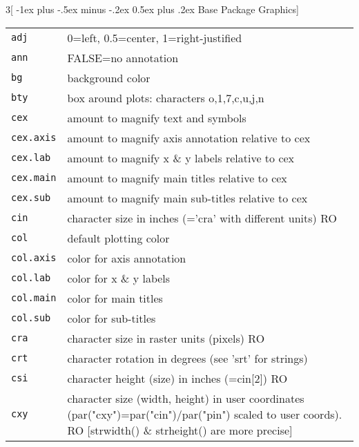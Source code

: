 \documentclass[landscape]{article}
\makeatletter
\renewcommand{\section}{\@startsection{section}{1}{0mm}%
                                {-1ex plus -.5ex minus -.2ex}%
                                {0.5ex plus .2ex}%
                                {\normalfont\large\bfseries}}
\makeatother
\begin{document}
\begin{multicols}{3}[\section{Base Package Graphics}]
\setlength{\tabcolsep}{0pt}
\setlength{\widthleftcol}{0.07\textwidth}
\setlength{\widthrightcol}{0.25\textwidth}
\begin{tabular}[t]{@{}p{\widthleftcol}p{\widthrightcol}@{}}
\hline
\verb|adj| & 0=left, 0.5=center, 1=right-justified \\
\verb|ann| & FALSE=no annotation \\
\verb|bg| & background color \\
\verb|bty| & box around plots: characters o,1,7,c,u,j,n \\
\verb|cex| & amount to magnify text and symbols \\
\verb|cex.axis| & amount to magnify axis annotation relative to cex \\
\verb|cex.lab| & amount to magnify x \& y labels relative to cex \\
\verb|cex.main| & amount to magnify main titles relative to cex \\
\verb|cex.sub| & amount to magnify main sub-titles relative to cex \\
\verb|cin| & character size in inches (='cra' with different units) RO \\
\verb|col| & default plotting color \\
\verb|col.axis| & color for axis annotation \\
\verb|col.lab| & color for x \& y labels \\
\verb|col.main| & color for main titles \\
\verb|col.sub| & color for sub-titles \\
\verb|cra| & character size in raster units (pixels) RO \\
\verb|crt| & character rotation in degrees (see 'srt' for strings) \\
\verb|csi| & character height (size) in inches (=cin[2]) RO \\
\verb|cxy| & character size (width, height) in user coordinates (par("cxy")=par("cin")/par("pin") scaled to user coords). RO [strwidth() \& strheight() are more precise] \\

\end{tabular}
\end{multicols}
\end{document}
